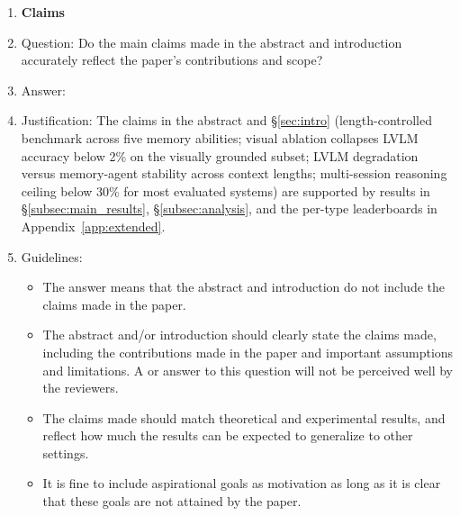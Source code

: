 \documentclass{article}
\begin{document}
\begin{enumerate}

\item {\bf Claims}
    \item[] Question: Do the main claims made in the abstract and introduction accurately reflect the paper's contributions and scope?
    \item[] Answer: \answerYes{}
    \item[] Justification: The claims in the abstract and \S\ref{sec:intro} (length-controlled benchmark across five memory abilities; visual ablation collapses LVLM accuracy below 2\% on the visually grounded subset; LVLM degradation versus memory-agent stability across context lengths; multi-session reasoning ceiling below 30\% for most evaluated systems) are supported by results in \S\ref{subsec:main_results}, \S\ref{subsec:analysis}, and the per-type leaderboards in Appendix~\ref{app:extended}.
    \item[] Guidelines:
    \begin{itemize}
        \item The answer \answerNA{} means that the abstract and introduction do not include the claims made in the paper.
        \item The abstract and/or introduction should clearly state the claims made, including the contributions made in the paper and important assumptions and limitations. A \answerNo{} or \answerNA{} answer to this question will not be perceived well by the reviewers.
        \item The claims made should match theoretical and experimental results, and reflect how much the results can be expected to generalize to other settings.
        \item It is fine to include aspirational goals as motivation as long as it is clear that these goals are not attained by the paper.
    \end{itemize}


\end{enumerate}
\end{document}

